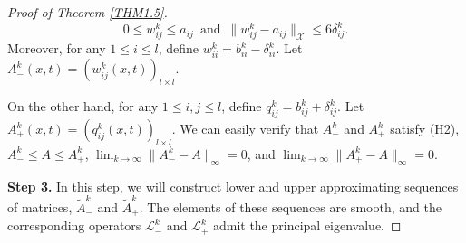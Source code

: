 \documentclass[11pt,reqno]{amsart}
\numberwithin{equation}{section}
\begin{document}
\begin{proof}[Proof of Theorem \ref{THM1.5}]
\begin{equation*}
0 \leq w_{ij}^{k} \leq a_{ij}
\enspace \text{and} \enspace
\|  w_{ij}^{k} - a_{ij}     \|_{\mathcal{X}} \leq 6\delta_{ij}^{k}.
\end{equation*}
Moreover, for any $1 \leq i \leq l$, define $w_{ii}^{k} = b_{ii}^{k} -\delta_{ii}^{k}$.
Let
$A_{-}^{k}(x,t) = (w_{ij}^{k}(x,t))_{l\times l}$.

On the other hand, for any $1\leq i,j \leq l$, define $q_{ij}^{k} = b_{ij}^{k} + \delta_{ij}^{k}$. Let $A_{+}^{k}(x,t) = (q_{ij}^{k}(x,t))_{l\times l}$.
We can easily verify that $A_{-}^{k}$ and $A_{+}^{k}$ satisfy (H2), $A_{-}^{k} \leq A \leq A_{+}^{k}$, $\lim_{k\to\infty} \| A_{-}^{k} - A \|_{\infty} =0$, and
$\lim_{k\to\infty} \| A_{+}^{k} - A \|_{\infty} =0$.

{\bf Step 3.} In this step, we will construct lower and upper approximating sequences of matrices, $\tilde{A}_{-}^{k}$ and $\tilde{A}_{+}^{k}$.
The elements of these sequences are smooth, and the corresponding operators $\mathcal{L}_{-}^{k}$ and  $\mathcal{L}_{+}^{k}$ admit the principal eigenvalue.


\end{proof}
\end{document}
